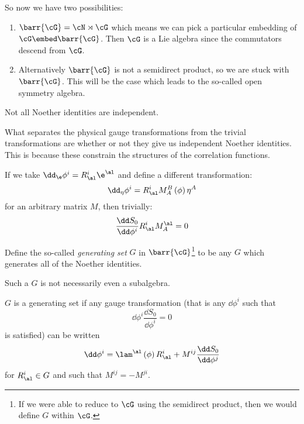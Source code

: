 \documentclass{booc}
\begin{document}
So now we have two possibilities:
\begin{enumerate}
\item $\barr{\cG} = \cN \rtimes \cG$
which means we can pick a particular embedding of $\cG\embed \barr{\cG}$.
Then $\cG$ is a Lie algebra since the commutators descend from $\cG$.

\item Alternatively $\barr{\cG}$ is not a semidirect product, so
we are stuck with $\barr{\cG}$. 
This will be the case which leads to the so-called open symmetry algebra.
\end{enumerate}

\begin{prop}
Not all Noether identities are independent. 
\end{prop}

\begin{rmk}
What separates the physical gauge transformations
from the trivial transformations are whether or not they give us
independent Noether identities.
This is because these constrain the structures of the correlation functions.
\end{rmk}

\begin{exm}
If we take $\dd_\e \phi^i = R^i_\al \e^\al$
and define a different transformation:
\begin{equation}
\dd_\eta \phi^i = R^i_\al M^B_A\left( \phi \right)\eta^A
\end{equation}
for an arbitrary matrix $M$, 
then trivially:
\begin{equation}
\frac{\dd S_0}{\dd \phi^i} R^i_\al M^\al_A = 0
\end{equation}
\end{exm}

Define the so-called \emph{generating set} $G$ in $\barr{\cG}$\footnote{
If we were able to reduce to $\cG$ using the semidirect product,
then we would define $G$ within $\cG$.}
to be any $G$ which generates all of the Noether identities. 

\begin{wrn}
Such a $G$ is not necessarily even a subalgebra. 
\end{wrn}

\begin{prop}
$G$ is a generating set if any gauge transformation (that is any $\dd \phi^i$
such that 
\begin{equation}
\dd \phi^i \frac{\dd S_0}{\dd \phi^i} = 0
\end{equation}
is satisfied) 
can be written 
\begin{equation}
\dd \phi^i = \lam^\al\left( \phi \right)R^i_\al
+ M^{ij} \frac{\dd S_0}{\dd \phi^j}
\end{equation}
for $R^i_\al \in G$ and such that $M^{ij} = -M^{ji}$.
\end{prop}
\end{document}
